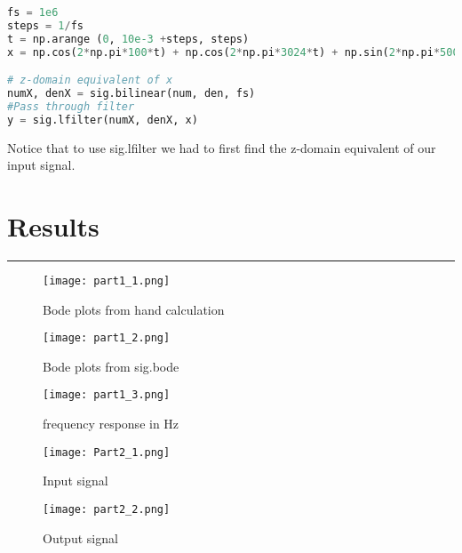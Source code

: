 \documentclass[12pt]{report}
\begin{document}
\begin{lstlisting}[language= Python, caption = Input and output signal code]
fs = 1e6
steps = 1/fs
t = np.arange (0, 10e-3 +steps, steps)
x = np.cos(2*np.pi*100*t) + np.cos(2*np.pi*3024*t) + np.sin(2*np.pi*50000*t)

# z-domain equivalent of x
numX, denX = sig.bilinear(num, den, fs)
#Pass through filter
y = sig.lfilter(numX, denX, x)
\end{lstlisting}

\vspace{1cm}
Notice that to use sig.lfilter we had to first find the z-domain equivalent of our input signal. \par
\section*{Results}
\hrule
\vspace{1cm}
\setlength{\parindent}{5ex}

\begin{figure}[htp]
     \centering
     \texttt{[image: part1\_1.png]}
     \caption{Bode plots from hand calculation}
     \label{fig:my_label}
 \end{figure}
\vspace{1cm}
\begin{figure}[htp]
     \centering
     \texttt{[image: part1\_2.png]}
     \caption{Bode plots from sig.bode}
     \label{fig:my_label}
 \end{figure}
\vspace{1cm}

\begin{figure}[htp]
     \centering
     \texttt{[image: part1\_3.png]}
     \caption{frequency response in Hz}
     \label{fig:my_label}
 \end{figure}
\vspace{1cm}

\begin{figure}[htp]
     \centering
     \texttt{[image: Part2\_1.png]}
     \caption{Input signal}
     \label{fig:my_label}
 \end{figure}
\vspace{1cm}

\begin{figure}[htp]
     \centering
     \texttt{[image: part2\_2.png]}
     \caption{Output signal}
     \label{fig:my_label}
 \end{figure}
\vspace{1cm}
\newpage
\end{document}
